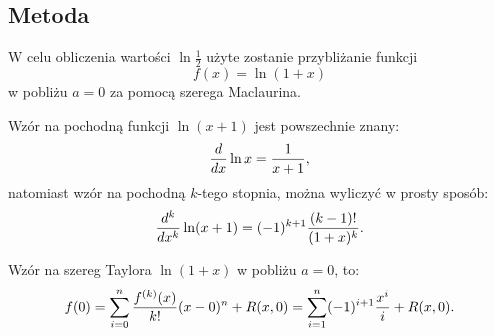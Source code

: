 \documentclass[11pt, wide, leqno]{mwart}
\begin{document}
\subsection{Metoda}

W celu obliczenia wartości $\ln\frac12$ użyte zostanie przybliżanie funkcji
$$f(x)=\ln (1+x)$$
w pobliżu $a=0$ za pomocą szerega Maclaurina.

Wzór na pochodną funkcji $\ln (x+1)$ jest powszechnie znany:
$${d\over dx}\ln x=\frac1{x+1},$$
natomiast wzór na pochodną $k$-tego stopnia, można wyliczyć w prosty sposób:
\begin{align}
    {d^k\over dx^k}\ln (x+1)=(-1)^{k+1}{(k-1)!\over(1+x)^{k}}.
\end{align}

Wzór na szereg Taylora $\ln (1+x)$ w pobliżu $a=0$, to:
$$f(0)=\sum\limits_{i=0}^n{f^{(k)}(x)\over k!}(x-0)^n + R(x, 0)=\sum\limits_{i=1}^n(-1)^{i+1}{x^i\over i}+R(x, 0).$$



\koniec
\end{document}
